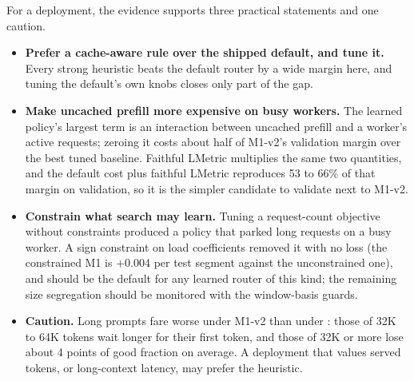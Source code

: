 For a deployment, the evidence supports three practical statements and one caution.
\begin{itemize}
  \item \textbf{Prefer a cache-aware rule over the shipped default, and tune it.} Every strong
    heuristic beats the default router by a wide margin here, and tuning the default's own knobs
    closes only part of the gap.
  \item \textbf{Make uncached prefill more expensive on busy workers.} The learned policy's largest
    term is an interaction between uncached prefill and a worker's active requests; zeroing it
    costs about half of M1-v2's validation margin over the best tuned baseline. Faithful LMetric
    multiplies the same two quantities, and the default cost plus faithful LMetric reproduces 53 to
    66\% of that margin on validation, so it is the simpler candidate to validate next to M1-v2.
  \item \textbf{Constrain what search may learn.} Tuning a request-count objective without
    constraints produced a policy that parked long requests on a busy worker. A sign constraint on
    load coefficients removed it with no loss (the constrained M1 is $+0.004$ per test segment against
    the unconstrained one), and should be the default for any learned router of this kind; the
    remaining size segregation should be monitored with the window-basis guards.
  \item \textbf{Caution.} Long prompts fare worse under M1-v2 than under : those of
    32K to 64K tokens wait longer for their first token, and those of 32K or more lose about 4 points
    of good fraction on average. A deployment that values served tokens, or long-context latency, may prefer the
    heuristic.
\end{itemize}


